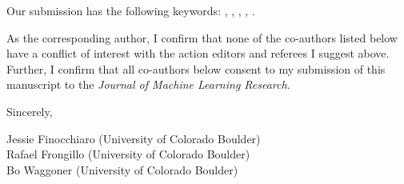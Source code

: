 Our submission has the following keywords: , , , , .

As the corresponding author, I confirm that none of the co-authors listed below have a conflict of interest with the action editors and referees I suggest above. Further, I confirm that all co-authors below consent to my submission of this manuscript to the \emph{Journal of Machine Learning Research}.

\bigskip

Sincerely,

\medskip

Jessie Finocchiaro (University of Colorado Boulder)\\
Rafael Frongillo (University of Colorado Boulder)\\
Bo Waggoner (University of Colorado Boulder)








































